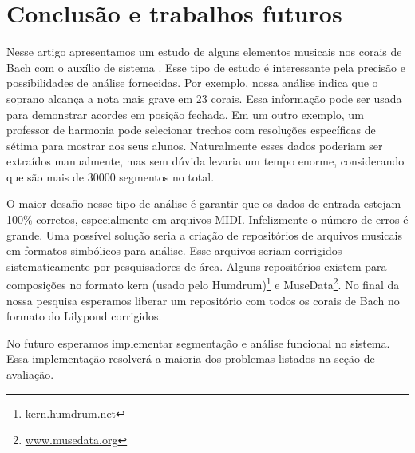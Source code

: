 \section{Conclusão e trabalhos futuros}
\label{sec:concl-e-trab}

Nesse artigo apresentamos um estudo de alguns elementos musicais nos
corais de Bach com o auxílio de sistema \rameau{}. Esse tipo de estudo
é interessante pela precisão e possibilidades de análise fornecidas.
Por exemplo, nossa análise indica que o soprano alcança a nota mais
grave em 23 corais. Essa informação pode ser usada para demonstrar
acordes em posição fechada. Em um outro exemplo, um professor de
harmonia pode selecionar trechos com resoluções específicas de sétima
para mostrar aos seus alunos. Naturalmente esses dados poderiam ser
extraídos manualmente, mas sem dúvida levaria um tempo enorme,
considerando que são mais de 30000 segmentos no total.

O maior desafio nesse tipo de análise é garantir que os dados de
entrada estejam 100\% corretos, especialmente em arquivos MIDI.
Infelizmente o número de erros é grande. Uma possível solução seria a
criação de repositórios de arquivos musicais em formatos simbólicos
para análise. Esse arquivos seriam corrigidos sistematicamente por
pesquisadores de área. Alguns repositórios existem para composições no
formato kern (usado pelo Humdrum)\footnote{\url{kern.humdrum.net}} e
MuseData\footnote{\url{www.musedata.org}}. No final da nossa pesquisa
esperamos liberar um repositório com todos os corais de Bach no
formato do Lilypond corrigidos.

No futuro esperamos implementar segmentação e análise funcional no
sistema. Essa implementação resolverá a maioria dos problemas listados
na seção de avaliação.

